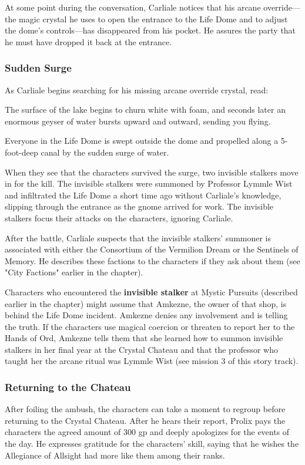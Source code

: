 \documentclass[10pt,a4paper,twoside,fancy,bg=print,twocolumn,openany,nodeprecatedcode]{dndbook}
\begin{document}
At some point during the conversation, Carliale notices that his arcane override—the magic crystal he uses to open the entrance to the Life Dome and to adjust the dome's controls—has disappeared from his pocket. He assures the party that he must have dropped it back at the entrance.

\subsubsection{Sudden Surge}
As Carliale begins searching for his missing arcane override crystal, read:

\begin{DndReadAloud}{}
The surface of the lake begins to churn white with foam, and seconds later an enormous geyser of water bursts upward and outward, sending you flying.

\end{DndReadAloud}

Everyone in the Life Dome is swept outside the dome and propelled along a 5-foot-deep canal by the sudden surge of water.

When they see that the characters survived the surge, two invisible stalkers move in for the kill. The invisible stalkers were summoned by Professor Lymmle Wist and infiltrated the Life Dome a short time ago without Carliale's knowledge, slipping through the entrance as the gnome arrived for work. The invisible stalkers focus their attacks on the characters, ignoring Carliale.

After the battle, Carliale suspects that the invisible stalkers' summoner is associated with either the Consortium of the Vermilion Dream or the Sentinels of Memory. He describes these factions to the characters if they ask about them (see "City Factions" earlier in the chapter).

Characters who encountered the \textbf{invisible stalker} at Mystic Pursuits (described earlier in the chapter) might assume that Amkezne, the owner of that shop, is behind the Life Dome incident. Amkezne denies any involvement and is telling the truth. If the characters use magical coercion or threaten to report her to the Hands of Ord, Amkezne tells them that she learned how to summon invisible stalkers in her final year at the Crystal Chateau and that the professor who taught her the arcane ritual was Lymmle Wist (see mission 3 of this story track).

\subsubsection{Returning to the Chateau}
After foiling the ambush, the characters can take a moment to regroup before returning to the Crystal Chateau. After he hears their report, Prolix pays the characters the agreed amount of 300 gp and deeply apologizes for the events of the day. He expresses gratitude for the characters' skill, saying that he wishes the Allegiance of Allsight had more like them among their ranks.
\end{document}
